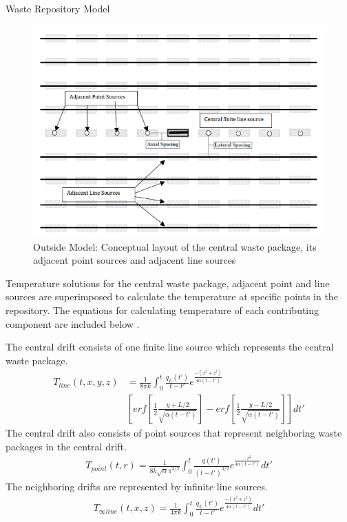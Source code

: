 \documentclass[final]{beamer}
\newlength{\onecolwid}
\newlength{\threecolwid}
\begin{document}
\begin{frame}[t]
\begin{columns}[t,totalwidth=\threecolwid]
\begin{column}{\onecolwid}
\begin{block}{Waste Repository Model}
\begin{figure}
	\label{fig:conceptual_layout}
	\includegraphics[width=0.9\linewidth]{outsidemodel}
	\caption{Outside Model: Conceptual layout of the central waste package, its adjacent
	point sources and adjacent line sources \cite{sutton_investigations_2011}}
\end{figure}

Temperature solutions for the central waste package, adjacent point and line sources 
are superimposed to calculate the temperature at specific points in the repository.
The equations for calculating temperature of each contributing component 
are included below \cite{sutton_investigations_2011}. 

The central drift consists of one finite line source which represents the central 
waste package. 
\begin{align*}
	T_{line}(t,x,y,z) &= \frac{1}{8 \pi k}  \int_{0}^{t} \frac{q_L(t')}{t-t'}e^{\frac{-(x^2+z^2)}{4\alpha(t-t')}} \\
	&[erf[\frac{1}{2}\frac{y+L/2}{\sqrt{\alpha(t-t')}}]-erf[\frac{1}{2}\frac{y-L/2}{\sqrt{\alpha(t-t')}}]] dt'
\end{align*}
The central drift also consists of point sources that represent neighboring 
waste packages in the central drift. 
\begin{align*}
	T_{point}(t,r) = \frac{1}{8 k \sqrt{\alpha} \pi^{3/2}} \int_{0}^{t}\frac{q(t')}{(t-t')^{3/2}}e^{\frac{-r^2}{4\alpha(t-t')}}dt'
\end{align*}
The neighboring drifts are represented by infinite line sources.  
\begin{align*}
	T_{\infty line}(t,x,z) = \frac{1}{4\pi k} \int_0^t \frac{q_L(t')}{t-t'} e^{\frac{-(x^2+z^2)}{4\alpha (t-t')}} dt'
\end{align*}


\end{block}
\end{column}
\end{columns}
\end{frame}
\end{document}
